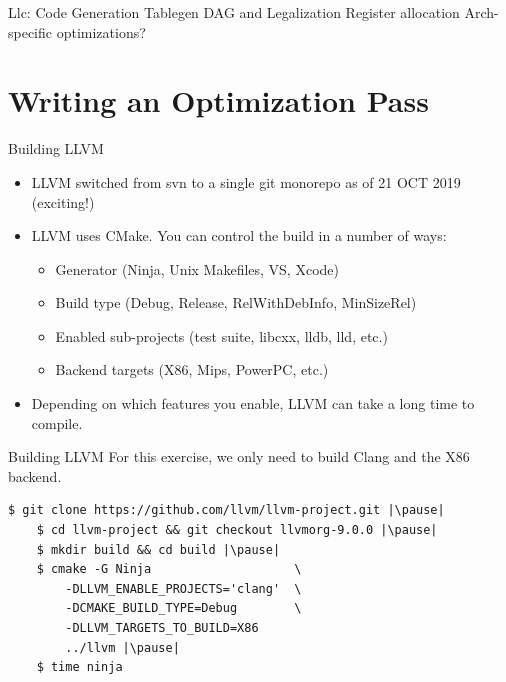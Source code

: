 \documentclass{beamer}
\begin{document}

\begin{frame}{Llc: Code Generation}
Tablegen
DAG and Legalization
Register allocation
Arch-specific optimizations?
\end{frame}


\section{Writing an Optimization Pass}


\begin{frame}{Building LLVM}
    \begin{itemize}
        \item LLVM switched from svn to a single git monorepo as of 21 OCT 2019 (exciting!)
        \item LLVM uses CMake. You can control the build in a number of ways:
        \begin{itemize}
            \item Generator (Ninja, Unix Makefiles, VS, Xcode)
            \item Build type (Debug, Release, RelWithDebInfo, MinSizeRel)
            \item Enabled sub-projects (test suite, libcxx, lldb, lld, etc.)
            \item Backend targets (X86, Mips, PowerPC, etc.)
        \end{itemize}
        \item Depending on which features you enable, LLVM can take a long time to compile.
    \end{itemize}
\end{frame}


\begin{frame}[fragile]{Building LLVM}
    For this exercise, we only need to build Clang and the X86 backend.

    \begin{lstlisting}[gobble=4]
    $ git clone https://github.com/llvm/llvm-project.git |\pause|
    $ cd llvm-project && git checkout llvmorg-9.0.0 |\pause|
    $ mkdir build && cd build |\pause|
    $ cmake -G Ninja                    \
        -DLLVM_ENABLE_PROJECTS='clang'  \
        -DCMAKE_BUILD_TYPE=Debug        \
        -DLLVM_TARGETS_TO_BUILD=X86
        ../llvm |\pause|
    $ time ninja

    \end{lstlisting}
\end{frame}
\end{document}
